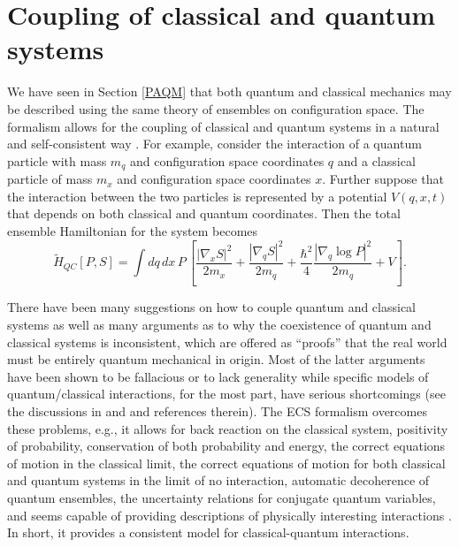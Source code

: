 \documentclass [12pt]{revtex4}
\begin{document}
\appendix
\section{Coupling of classical and quantum systems}\label{ECS}

We have seen in Section \ref{PAQM} that both quantum and classical mechanics
may be described using the same theory of ensembles on configuration space.  
The formalism allows for the
coupling of classical and quantum systems in a natural and
self-consistent way \cite{HR2005, H2008, RH2009}. For example, consider the interaction of a
quantum particle with mass $m_{q}$ and configuration space
coordinates $q$ and a classical particle of mass $m_{x} $ and
configuration space coordinates $x$. Further suppose that the
interaction between the two particles is represented by a potential
$V(q,x,t)$ that depends on both classical and quantum coordinates.
Then the total  ensemble  Hamiltonian for the system becomes
\begin{equation}\label{HQC}
\tilde{H}_{QC}[P,S] = \int dq\,dx\, P\,\left[ \frac{|\nabla_x S|^2}{2m_x}
+ \frac{|\nabla_q S|^2}{2m_q} + \frac{\hbar^2}{4} \frac{|\nabla_q \log P|^2}{2m_q} + V  \right].
\end{equation}

There have been many suggestions on how to couple quantum and
classical systems as well as many arguments as
to why the coexistence of quantum and classical systems is
inconsistent, which are offered as ``proofs'' that the real world
must be entirely quantum mechanical in origin.
Most of the latter arguments have been shown to be fallacious or to
lack generality while specific models of
quantum/classical interactions, for the most part, have serious
shortcomings (see the discussions in \cite{HR2005} and \cite{H2008}
and references therein). The ECS
formalism overcomes these problems, e.g., it allows for back
reaction on the classical system, positivity of probability,
conservation of both probability and energy, the correct equations
of motion in the classical limit, the correct equations of motion
for both classical and quantum systems in the limit of no
interaction, automatic decoherence of quantum ensembles, the
uncertainty relations for conjugate quantum variables, and seems
capable of providing descriptions of physically interesting
interactions \cite{HR2005,RH2009,H2008}. In short, it
provides a consistent model for classical-quantum interactions.
\end{document}
